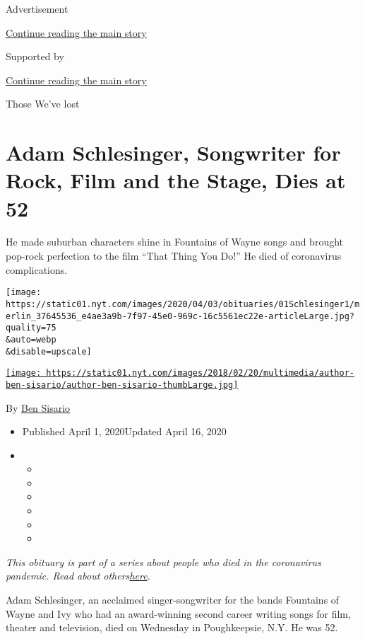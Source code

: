 Advertisement

\protect\hyperlink{after-top}{Continue reading the main story}

Supported by

\protect\hyperlink{after-sponsor}{Continue reading the main story}

Those We've lost

\hypertarget{adam-schlesinger-songwriter-for-rock-film-and-the-stage-dies-at-52}{%
\section{Adam Schlesinger, Songwriter for Rock, Film and the Stage, Dies
at
52}\label{adam-schlesinger-songwriter-for-rock-film-and-the-stage-dies-at-52}}

He made suburban characters shine in Fountains of Wayne songs and
brought pop-rock perfection to the film ``That Thing You Do!'' He died
of coronavirus complications.

\texttt{[image: https://static01.nyt.com/images/2020/04/03/obituaries/01Schlesinger1/merlin\_37645536\_e4ae3a9b-7f97-45e0-969c-16c5561ec22e-articleLarge.jpg?quality=75\\\&auto=webp\\\&disable=upscale]}

\href{https://www.nytimes.com/by/ben-sisario}{\texttt{[image: https://static01.nyt.com/images/2018/02/20/multimedia/author-ben-sisario/author-ben-sisario-thumbLarge.jpg]}}

By \href{https://www.nytimes.com/by/ben-sisario}{Ben Sisario}

\begin{itemize}
\item
  Published April 1, 2020Updated April 16, 2020
\item
  \begin{itemize}
  \item
  \item
  \item
  \item
  \item
  \item
  \end{itemize}
\end{itemize}

\emph{This obituary is part of a series about people who died in the
coronavirus pandemic. Read about
others}\href{https://www.nytimes.com/series/people-who-have-died-of-the-coronavirus}{\emph{here}}\emph{.}

Adam Schlesinger, an acclaimed singer-songwriter for the bands Fountains
of Wayne and Ivy who had an award-winning second career writing songs
for film, theater and television, died on Wednesday in Poughkeepsie,
N.Y. He was 52.


